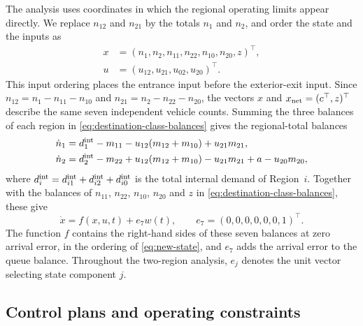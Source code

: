 \documentclass[final]{cas-sc}
\theoremstyle{definition}
\theoremstyle{plain}
\theoremstyle{definition}
\theoremstyle{plain}
\begin{document}
The analysis uses coordinates in which the regional operating limits
appear directly. We replace $n_{12}$ and $n_{21}$ by the totals $n_1$
and $n_2$, and order the state and the inputs as
\begin{equation}
\begin{aligned}
x&=(n_1,n_2,n_{11},n_{22},n_{10},n_{20},z)^\top ,\\
u&=(u_{12},u_{21},u_{02},u_{20})^\top .
\end{aligned}
\label{eq:new-state}
\end{equation}
This input ordering places the entrance input before the exterior-exit
input. Since $n_{12}=n_1-n_{11}-n_{10}$ and
$n_{21}=n_2-n_{22}-n_{20}$, the vectors $x$ and
$x_{\rm net}=(c^\top,z)^\top$ describe the same seven independent
vehicle counts. Summing the three balances of each region in
\eqref{eq:destination-class-balances} gives the regional-total balances
\begin{equation}
\begin{aligned}
\dot n_1&=d_1^{\rm int}-m_{11}-u_{12}(m_{12}+m_{10})+u_{21}m_{21},\\
\dot n_2&=d_2^{\rm int}-m_{22}+u_{12}(m_{12}+m_{10})-u_{21}m_{21}
+a-u_{20}m_{20},
\end{aligned}
\label{eq:regional-flow-balances}
\end{equation}
where $d_i^{\rm int}=d_{i1}^{\rm int}+d_{i2}^{\rm int}+d_{i0}^{\rm int}$
is the total internal demand of Region~$i$. Together with the balances
of $n_{11}$, $n_{22}$, $n_{10}$, $n_{20}$ and $z$ in
\eqref{eq:destination-class-balances}, these give
\begin{equation}
\dot x=f(x,u,t)+e_7w(t),\qquad e_7=(0,0,0,0,0,0,1)^\top .
\label{eq:new-plant}
\end{equation}
The function $f$ contains the right-hand sides of these seven balances
at zero arrival error, in the ordering of
\eqref{eq:new-state}, and $e_7$ adds the arrival error to the
queue balance. Throughout the two-region analysis, $e_j$ denotes the
unit vector selecting state component $j$.

\subsection{Control plans and operating constraints}
\label{sec:physical-constraints}
\end{document}
